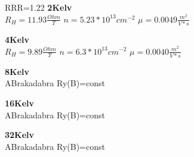 \documentclass[idxtotoc,hyperref,openany,oneside]{labbook} %
\begin{document}
RRR=1.22
\newline
\normalsize \textbf{2Kelv}\\
$R_H=11.93 \frac{Ohm}{T}$
\newline
$n=5.23*10^{13} cm^{-2}$
\newline
$\mu= 0.0049\frac{m^2}{V*s}$
\newline
\newline

\normalsize \textbf{4Kelv}\\
$R_H=9.89 \frac{Ohm}{T}$
\newline
$n=6.3*10^{13} cm^{-2}$
\newline
$\mu= 0.0040\frac{m^2}{V*s}$
\newline
\newline


\normalsize \textbf{8Kelv}\\
ABrakadabra Ry(B)=const
\newline
\newline


\normalsize \textbf{16Kelv}\\
ABrakadabra Ry(B)=const
\newline
\newline

\normalsize \textbf{32Kelv}\\
ABrakadabra Ry(B)=const
\newline
\newline


\end{document}

